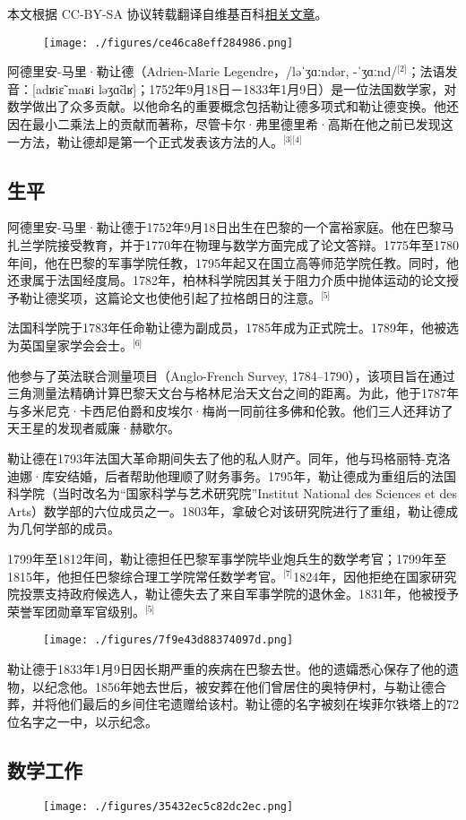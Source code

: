 
本文根据 CC-BY-SA 协议转载翻译自维基百科\href{https://en.wikipedia.org/wiki/Adrien-Marie_Legendre}{相关文章}。

\begin{figure}[ht]
\centering
\texttt{[image: ./figures/ce46ca8eff284986.png]}
\caption{} \label{fig_adla_1}
\end{figure}
阿德里安-马里·勒让德（Adrien-Marie Legendre，/ləˈʒɑːndər, -ˈʒɑːnd/\(^\text{[2]}\)；法语发音：[adʁiɛ̃ maʁi ləʒɑ̃dʁ]；1752年9月18日－1833年1月9日）是一位法国数学家，对数学做出了众多贡献。以他命名的重要概念包括勒让德多项式和勒让德变换。他还因在最小二乘法上的贡献而著称，尽管卡尔·弗里德里希·高斯在他之前已发现这一方法，勒让德却是第一个正式发表该方法的人。\(^\text{[3][4]}\)
\subsection{生平}
阿德里安-马里·勒让德于1752年9月18日出生在巴黎的一个富裕家庭。他在巴黎马扎兰学院接受教育，并于1770年在物理与数学方面完成了论文答辩。1775年至1780年间，他在巴黎的军事学院任教，1795年起又在国立高等师范学院任教。同时，他还隶属于法国经度局。1782年，柏林科学院因其关于阻力介质中抛体运动的论文授予勒让德奖项，这篇论文也使他引起了拉格朗日的注意。\(^\text{[5]}\)

法国科学院于1783年任命勒让德为副成员，1785年成为正式院士。1789年，他被选为英国皇家学会会士。\(^\text{[6]}\)

他参与了英法联合测量项目（Anglo-French Survey, 1784–1790），该项目旨在通过三角测量法精确计算巴黎天文台与格林尼治天文台之间的距离。为此，他于1787年与多米尼克·卡西尼伯爵和皮埃尔·梅尚一同前往多佛和伦敦。他们三人还拜访了天王星的发现者威廉·赫歇尔。

勒让德在1793年法国大革命期间失去了他的私人财产。同年，他与玛格丽特-克洛迪娜·库安结婚，后者帮助他理顺了财务事务。1795年，勒让德成为重组后的法国科学院（当时改名为“国家科学与艺术研究院”Institut National des Sciences et des Arts）数学部的六位成员之一。1803年，拿破仑对该研究院进行了重组，勒让德成为几何学部的成员。

1799年至1812年间，勒让德担任巴黎军事学院毕业炮兵生的数学考官；1799年至1815年，他担任巴黎综合理工学院常任数学考官。\(^\text{[7]}\)1824年，因他拒绝在国家研究院投票支持政府候选人，勒让德失去了来自军事学院的退休金。1831年，他被授予荣誉军团勋章军官级别。\(^\text{[5]}\)
\begin{figure}[ht]
\centering
\texttt{[image: ./figures/7f9e43d88374097d.png]}
\caption{} \label{fig_adla_2}
\end{figure}
勒让德于1833年1月9日因长期严重的疾病在巴黎去世。他的遗孀悉心保存了他的遗物，以纪念他。1856年她去世后，被安葬在他们曾居住的奥特伊村，与勒让德合葬，并将他们最后的乡间住宅遗赠给该村。勒让德的名字被刻在埃菲尔铁塔上的72位名字之一中，以示纪念。
\subsection{数学工作}
\begin{figure}[ht]
\centering
\texttt{[image: ./figures/35432ec5c82dc2ec.png]}
\caption{} \label{fig_adla_3}
\end{figure}